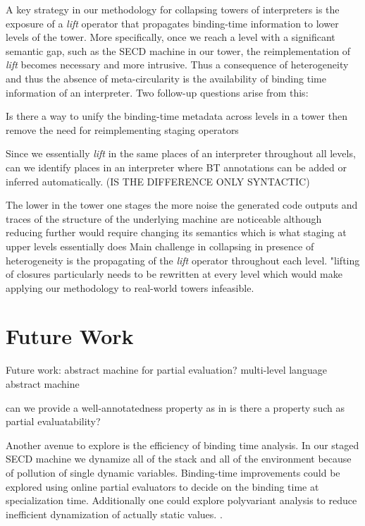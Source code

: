 \documentclass{article}
\theoremstyle{definition}
\begin{document}
A key strategy in our methodology for collapsing towers of interpreters is the exposure of a \textit{lift} operator that propagates binding-time information to lower levels of the tower. More specifically, once we reach a level with a significant semantic gap, such as the SECD machine in our tower, the reimplementation of \textit{lift} becomes necessary and more intrusive. Thus a consequence of heterogeneity and thus the absence of meta-circularity is the availability of binding time information of an interpreter. Two follow-up questions arise from this:
\begin{enumerate*}
	\item Is there a way to unify the binding-time metadata across levels in a tower then remove the need for reimplementing staging operators
	\item Since we essentially \textit{lift} in the same places of an interpreter throughout all levels, can we identify places in an interpreter where BT annotations can be added or inferred automatically. (IS THE DIFFERENCE ONLY SYNTACTIC)
\end{enumerate*}

The lower in the tower one stages the more noise the generated code outputs and traces of the structure of the underlying machine are noticeable although reducing further would require changing its semantics which is what staging at upper levels essentially does
Main challenge in collapsing in presence of heterogeneity is the propagating of the \textit{lift} operator throughout each level. "lifting of closures particularly needs to be rewritten at every level which would make applying our methodology to real-world towers infeasible.

\section{Future Work}
Future work:
abstract machine for partial evaluation? multi-level language abstract machine

can we provide a well-annotatedness property as in \cite{gomard1991partial}
is there a property such as partial evaluatability?

Another avenue to explore is the efficiency of binding time analysis. In our staged SECD machine we dynamize all of the stack and all of the environment because of pollution of single dynamic variables. Binding-time improvements could be explored using online partial evaluators to decide on the binding time at specialization time. Additionally one could explore polyvariant analysis to reduce inefficient dynamization of actually static values. \cite{danvy1995essence}.
\end{document}
